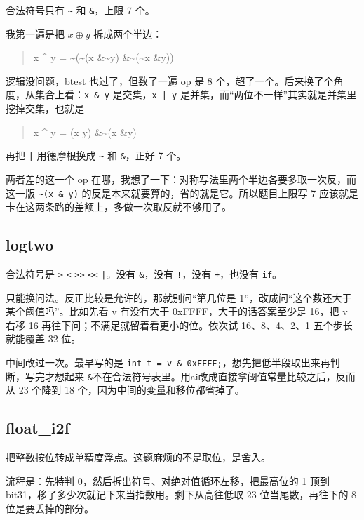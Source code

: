\documentclass[UTF8,a4paper,11pt,fontset=windows]{ctexart}
\newcommand{\code}[1]{\texttt{#1}}
\newcommand{\oTilde}{\texttt{\textasciitilde}}
\newcommand{\oAmp}{\texttt{\&}}
\newcommand{\cTilde}{\textasciitilde{}}
\newcommand{\cCir}{\textasciicircum{}}
\newcommand{\cAmp}{\&}
\newcommand{\cPipe}{\textbar}
\newenvironment{codeblock}
  {\begin{quote}\ttfamily\small}
  {\end{quote}}
\begin{document}
合法符号只有 \oTilde{} 和 \oAmp，上限 7 个。

我第一遍是把 $x \oplus y$ 拆成两个半边：

\begin{codeblock}
x \cCir{} y = \cTilde(\cTilde(x \cAmp \cTilde{}y) \cAmp \cTilde(\cTilde{}x \cAmp y))
\end{codeblock}

逻辑没问题，btest 也过了，但数了一遍 op 是 8 个，超了一个。后来换了个角度，从集合上看：\code{x \& y} 是交集，\code{x | y} 是并集，而“两位不一样”其实就是并集里挖掉交集，也就是

\begin{codeblock}
x \cCir{} y = (x \cPipe{} y) \cAmp \cTilde(x \cAmp y)
\end{codeblock}

再把 \code{|} 用德摩根换成 \oTilde{} 和 \oAmp，正好 7 个。

两者差的这一个 op 在哪，我想了一下：对称写法里两个半边各要多取一次反，而这一版 \code{\cTilde(x \& y)} 的反是本来就要算的，省的就是它。所以题目上限写 7 应该就是卡在这两条路的差额上，多做一次取反就不够用了。

\subsection{logtwo}

合法符号是 \code{>} \code{<} \code{>>} \code{<<} \code{|}。没有 \oAmp，没有 \code{!}，没有 \code{+}，也没有 \code{if}。

只能换问法。反正比较是允许的，那就别问“第几位是 1”，改成问“这个数还大于某个阈值吗”。比如先看 v 有没有大于 0xFFFF，大于的话答案至少是 16，把 v 右移 16 再往下问；不满足就留着看更小的位。依次试 16、8、4、2、1 五个步长就能覆盖 32 位。

中间改过一次。最早写的是 \code{int t = v \& 0xFFFF;}，想先把低半段取出来再判断，写完才想起来 \oAmp 不在合法符号表里。用ai改成直接拿阈值常量比较之后，反而从 23 个降到 18 个，因为中间的变量和移位都省掉了。

\subsection{float\_i2f}

把整数按位转成单精度浮点。这题麻烦的不是取位，是舍入。

流程是：先特判 0，然后拆出符号、对绝对值循环左移，把最高位的 1 顶到 bit31，移了多少次就记下来当指数用。剩下从高往低取 23 位当尾数，再往下的 8 位是要丢掉的部分。
\end{document}
